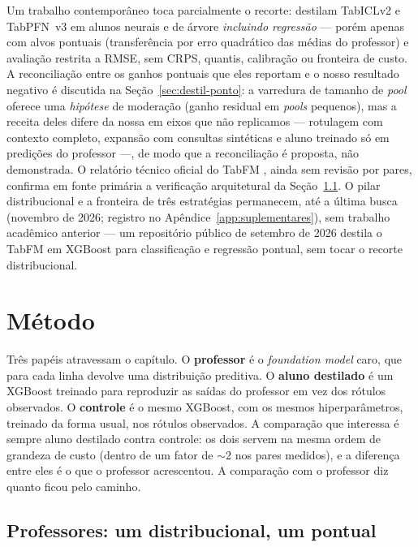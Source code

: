 Um trabalho contemporâneo toca parcialmente o recorte:
\citet{jeong2026} destilam TabICLv2 e TabPFN~v3 em
alunos neurais e de árvore \emph{incluindo regressão} --- porém apenas
com alvos pontuais (transferência por erro quadrático das médias do
professor) e avaliação restrita a RMSE, sem CRPS, quantis, calibração ou
fronteira de custo. A reconciliação entre os ganhos pontuais que eles
reportam e o nosso resultado negativo é discutida na
Seção~\ref{sec:destil-ponto}: a varredura de tamanho de \emph{pool}
oferece uma \emph{hipótese} de moderação (ganho residual em
\emph{pools} pequenos), mas a receita deles difere da nossa em eixos
que não replicamos --- rotulagem com contexto completo, expansão com
consultas sintéticas e aluno treinado só em predições do professor ---,
de modo que a reconciliação é proposta, não demonstrada. O
relatório técnico oficial do TabFM \citep{kong2026}, ainda sem
revisão por pares, confirma em fonte primária a verificação
arquitetural da Seção~\ref{sec:destil-professores}. O pilar
distribucional e a
fronteira de três estratégias permanecem, até a última busca
(novembro de 2026; registro no Apêndice~\ref{app:suplementares}),
sem trabalho acadêmico anterior --- um repositório público
de setembro de 2026 destila o TabFM em XGBoost para classificação e
regressão
pontual, sem tocar o recorte distribucional.

\section{Método}
\label{sec:destil-metodo}

Três papéis atravessam o capítulo. O \textbf{professor} é o
\emph{foundation model} caro, que para cada linha devolve uma
distribuição preditiva. O \textbf{aluno destilado} é um XGBoost
treinado para reproduzir as saídas do professor em vez dos rótulos
observados. O \textbf{controle} é o mesmo XGBoost, com os mesmos
hiperparâmetros, treinado da forma usual, nos rótulos observados. A
comparação que interessa é sempre aluno destilado contra controle: os
dois servem na mesma ordem de grandeza de custo (dentro de um fator
de ${\sim}2$ nos pares medidos), e a diferença entre eles é o que o
professor acrescentou. A comparação com o professor diz quanto ficou
pelo caminho.

\subsection{Professores: um distribucional, um pontual}
\label{sec:destil-professores}

